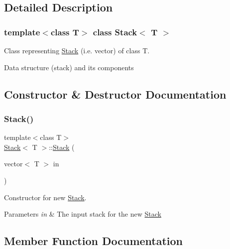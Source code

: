 \subsection{Detailed Description}
\subsubsection*{template$<$class T$>$\newline
class Stack$<$ T $>$}

Class representing \mbox{\hyperlink{class_stack}{Stack}} (i.\+e. vector) of class T. 

Data structure (stack) and its components 

\subsection{Constructor \& Destructor Documentation}
\mbox{\label{class_stack_a3f5265e48ea9fda2e04aa2239fa6ab01}} 
\subsubsection{\texorpdfstring{Stack()}{Stack()}}
{\footnotesize\ttfamily template$<$class T$>$ \\
\mbox{\hyperlink{class_stack}{Stack}}$<$ T $>$\+::\mbox{\hyperlink{class_stack}{Stack}} (\begin{DoxyParamCaption}\item[{vector$<$ T $>$}]{in }\end{DoxyParamCaption})}



Constructor for new \mbox{\hyperlink{class_stack}{Stack}}. 


\begin{DoxyParams}{Parameters}
{\em in} & The input stack for the new \mbox{\hyperlink{class_stack}{Stack}} \\
\hline
\end{DoxyParams}


\subsection{Member Function Documentation}
\mbox{\label{class_stack_a0682e08ce3a10b12697dfd828a83268f}} 
